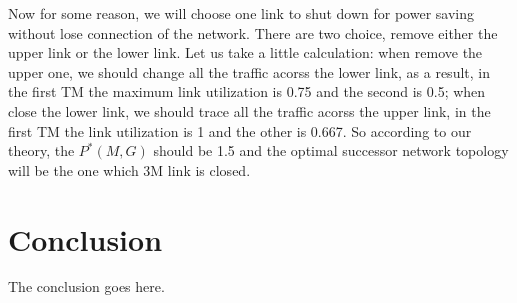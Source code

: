 \documentclass[conference]{IEEEtran}
\begin{document}
Now for some reason, we will choose one link to shut down for power saving without lose connection of the network. 
There are two choice, remove either the upper link or the lower link. Let us take a little calculation: when 
remove the upper one, we should change all the traffic acorss the lower link, as a result, in the first  
TM the maximum link utilization is 0.75 and the second is 0.5; when close the lower link, we should trace all the 
traffic acorss the upper link, in the first TM the link utilization is 1 and the other is 0.667. 
So according to our theory, the $P^{*}(M, G)$ should be 1.5 and the optimal successor network topology will be
the one which 3M link is closed.


\section{Conclusion}
The conclusion goes here.


\end{document}
